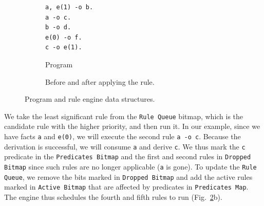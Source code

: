 \begin{figure}[h]
   \vspace{-\intextsep}
   \centering
   \begin{subfigure}[b]{0.2\textwidth}
      \centering
      {\footnotesize\begin{Verbatim}
a, e(1) -o b.
a -o c.
b -o d.
e(0) -o f.
c -o e(1).
      \end{Verbatim}
      }
      \begin{minipage}{.3cm}
                  \vfill
                  \end{minipage}
      \caption{Program}
      \label{code:5rules}
   \end{subfigure}
   \begin{subfigure}[b]{0.7\textwidth}
      \caption{Before and after applying the  rule.}
   \end{subfigure}
   \caption{Program and rule engine data structures.}
   \label{fig:rule_engine}
   \vspace{-0.8\intextsep}
\end{figure}

We take the least significant rule from the \texttt{Rule Queue} bitmap, which is the candidate rule with the higher priority, and then run it. In our example, since we have facts \texttt{a} and \texttt{e(0)},
we will execute the second rule \texttt{a -o c}.
Because the derivation is successful, we will consume \texttt{a} and derive \texttt{c}.
We thus mark the \texttt{c} predicate in the \texttt{Predicates Bitmap} and the first and second rules
in \texttt{Dropped Bitmap} since such rules are no longer applicable (\texttt{a} is gone). To update the \texttt{Rule Queue},
we remove the bits marked in \texttt{Dropped Bitmap} and add the active rules marked in \texttt{Active Bitmap} that are affected
by predicates in \texttt{Predicates Map}. The engine thus schedules the fourth and fifth rules to run (Fig.~\ref{fig:rule_engine}b).

